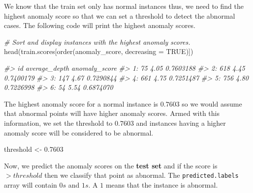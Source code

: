 \documentclass[
  11pt,
]{krantz}
\newenvironment{Shaded}{\begin{snugshade}}{\end{snugshade}}
\newcommand{\AttributeTok}[1]{\textcolor[rgb]{0.61,0.61,0.61}{#1}}
\newcommand{\CommentTok}[1]{\textcolor[rgb]{0.37,0.37,0.37}{\textit{#1}}}
\newcommand{\ConstantTok}[1]{\textcolor[rgb]{0,0,0}{#1}}
\newcommand{\DecValTok}[1]{\textcolor[rgb]{0.06,0.06,0.06}{#1}}
\newcommand{\FloatTok}[1]{\textcolor[rgb]{0.06,0.06,0.06}{#1}}
\newcommand{\FunctionTok}[1]{\textcolor[rgb]{0,0,0}{#1}}
\newcommand{\NormalTok}[1]{#1}
\newcommand{\OtherTok}[1]{\textcolor[rgb]{0.37,0.37,0.37}{#1}}
\newcommand{\SpecialCharTok}[1]{\textcolor[rgb]{0,0,0}{#1}}
\begin{document}
We know that the train set only has normal instances thus, we need to find the highest anomaly score so that we can set a threshold to detect the abnormal cases. The following code will print the highest anomaly scores.

\begin{Shaded}
\begin{Highlighting}[]
\CommentTok{\# Sort and display instances with the highest anomaly scores.}
\FunctionTok{head}\NormalTok{(train.scores[}\FunctionTok{order}\NormalTok{(anomaly\_score, }\AttributeTok{decreasing =} \ConstantTok{TRUE}\NormalTok{)])}

\CommentTok{\#\textgreater{}     id average\_depth anomaly\_score}
\CommentTok{\#\textgreater{} 1:  75          4.05     0.7603188}
\CommentTok{\#\textgreater{} 2: 618          4.45     0.7400179}
\CommentTok{\#\textgreater{} 3: 147          4.67     0.7290844}
\CommentTok{\#\textgreater{} 4: 661          4.75     0.7251487}
\CommentTok{\#\textgreater{} 5: 756          4.80     0.7226998}
\CommentTok{\#\textgreater{} 6:  54          5.54     0.6874070}
\end{Highlighting}
\end{Shaded}

The highest anomaly score for a normal instance is \(0.7603\) so we would assume that abnormal points will have higher anomaly scores. Armed with this information, we set the threshold to \(0.7603\) and instances having a higher anomaly score will be considered to be abnormal.

\begin{Shaded}
\begin{Highlighting}[]
\NormalTok{threshold }\OtherTok{\textless{}{-}} \FloatTok{0.7603}
\end{Highlighting}
\end{Shaded}

Now, we predict the anomaly scores on the \textbf{test set} and if the score is \(> threshold\) then we classify that point as abnormal. The \texttt{predicted.labels} array will contain \(0s\) and \(1s\). A \(1\) means that the instance is abnormal.

\begin{Shaded}
\end{Shaded}
\end{document}
